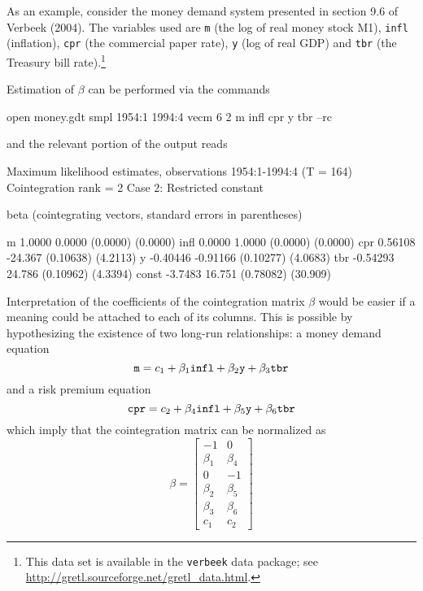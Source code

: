 As an example, consider the money demand system presented in section
9.6 of Verbeek (2004).  The variables used are \texttt{m} (the log of
real money stock M1), \texttt{infl} (inflation), \texttt{cpr} (the
commercial paper rate), \texttt{y} (log of real GDP) and \texttt{tbr}
(the Treasury bill rate).\footnote{This data set is available in the
  \texttt{verbeek} data package; see
  \url{http://gretl.sourceforge.net/gretl_data.html}.}

Estimation of $\beta$ can be performed via the commands
\begin{code}
  open money.gdt 
  smpl 1954:1 1994:4 
  vecm 6 2 m infl cpr y tbr --rc
\end{code}
and the relevant portion of the output reads
\begin{code}
Maximum likelihood estimates, observations 1954:1-1994:4 (T = 164)
Cointegration rank = 2
Case 2: Restricted constant

beta (cointegrating vectors, standard errors in parentheses)

m           1.0000       0.0000 
           (0.0000)     (0.0000) 
infl        0.0000       1.0000 
           (0.0000)     (0.0000) 
cpr        0.56108      -24.367 
          (0.10638)     (4.2113) 
y         -0.40446     -0.91166 
          (0.10277)     (4.0683) 
tbr       -0.54293       24.786 
          (0.10962)     (4.3394) 
const      -3.7483       16.751 
          (0.78082)     (30.909) 
\end{code}
Interpretation of the coefficients of the cointegration matrix $\beta$
would be easier if a meaning could be attached to each of its
columns. This is possible by hypothesizing the existence of two
long-run relationships: a money demand equation
\begin{equation}
  \label{eq:verbeek-mondem}
  \mbox{\tt m} = c_1 + \beta_1 \mbox{\tt infl} + \beta_2 \mbox{\tt
    y} + \beta_3 \mbox{\tt tbr}
\end{equation}
and a risk premium equation
\begin{equation}
  \label{eq:verbeek-premium}
 \mbox{\tt cpr} = c_2 + \beta_4 \mbox{\tt infl} +
   \beta_5 \mbox{\tt y} + \beta_6 \mbox{\tt tbr}
\end{equation}
which imply that the cointegration matrix can be normalized as
\[
  \beta = \left[
    \begin{array}{rr}
      -1 & 0 \\ \beta_1 & \beta_4 \\ 0 & -1 \\ \beta_2 & \beta_5
      \\ \beta_3 & \beta_6 \\ c_1 & c_2
    \end{array}
    \right]
\]

